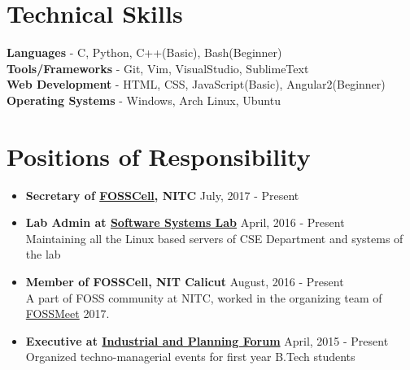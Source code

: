 \documentclass[margin, centered, 10.5pt]{res}
\begin{document}
\begin{resume}
\section{Technical \hspace{2mm} Skills}
\textbf{Languages} - C, Python, C++(Basic), Bash(Beginner) \\
\textbf{Tools/Frameworks} - Git, Vim, VisualStudio, SublimeText \\
\textbf{Web Development} - HTML, CSS, JavaScript(Basic), Angular2(Beginner)\\
\textbf{Operating Systems} - Windows, Arch Linux, Ubuntu


\section{Positions of \hspace{2mm} Responsibility}
\begin{itemize}[leftmargin=*]
\item\textbf{{Secretary of \href{https://twitter.com/FOSSCell}{FOSSCell}, NITC}} \hfill July, 2017 - Present
\item\textbf{Lab Admin at \href{http://athena.nitc.ac.in}{Software Systems Lab}} \hfill April, 2016 - Present\\
Maintaining all the Linux based servers of CSE Department and systems of the lab
\item\textbf{Member of FOSSCell, NIT Calicut} \hfill August, 2016 - Present\\
A part of FOSS community at NITC, worked in the organizing team of \href{http://fossmeet.in}{FOSSMeet} 2017.
\item\textbf{Executive at \href{https://www.facebook.com/ipfnitc}{Industrial and Planning Forum}} \hfill April, 2015 - Present\\
Organized techno-managerial events for first year B.Tech students
\end{itemize}


\end{resume}
\end{document}
